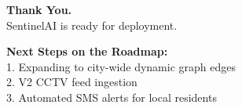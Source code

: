 \documentclass[aspectratio=169, xcolor=table]{beamer}
\begin{document}
\begin{frame}[plain]
    \begin{center}
        \vspace*{2cm}
        {\Huge \textbf{Thank You.}} \\
        \vspace{0.5cm}
        {\Large SentinelAI is ready for deployment.} \\
        \vspace{1.5cm}
        
        \begin{tcolorbox}[sentinelcard, width=0.6\textwidth, center]
            \centering
            \textbf{Next Steps on the Roadmap:} \\
            \vspace{0.2cm}
            \small
            1. Expanding to city-wide dynamic graph edges \\
            2. V2 CCTV feed ingestion \\
            3. Automated SMS alerts for local residents
        \end{tcolorbox}
    \end{center}
\end{frame}
\end{document}
